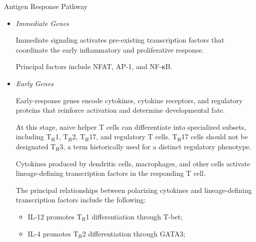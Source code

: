 \begin{core}{Antigen Response Pathway}
\begin{enumerate}[label=(\arabic*)]
          \begin{itemize}

            \item \textit{Immediate Genes}

              Immediate signaling activates pre-existing transcription factors that coordinate the early inflammatory and proliferative response.

              Principal factors include NFAT, AP-1, and NF-κB.

            \item \textit{Early Genes}

              Early-response genes encode cytokines, cytokine receptors, and regulatory proteins that reinforce activation and determine developmental fate.

              At this stage, naive helper T cells can differentiate into specialized subsets, including T$_{\text{H}}$1, T$_{\text{H}}$2, T$_{\text{H}}$17, and regulatory T cells. T$_{\text{H}}$17 cells should not be designated T$_{\text{H}}$3, a term historically used for a distinct regulatory phenotype.

              Cytokines produced by dendritic cells, macrophages, and other cells activate lineage-defining transcription factors in the responding T cell.

              The principal relationships between polarizing cytokines and lineage-defining transcription factors include the following:

              \begin{itemize}

                \item IL-12 promotes T$_{\text{H}}$1 differentiation through T-bet;

                \item IL-4 promotes T$_{\text{H}}$2 differentiation through GATA3;


\end{itemize}
\end{itemize}
\end{enumerate}
\end{core}
